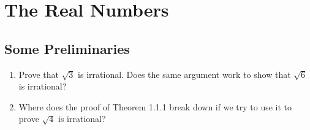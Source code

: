 \documentclass{lew98_solutions}
\begin{document}
\thispagestyle{plain}

\chapter{The Real Numbers}
\label{chap:1}

\setcounter{section}{1}
\section{Some Preliminaries}
\label{sec:1.2}

\begin{exercise}
\label{ex:1.2.1}
    \begin{enumerate}
        \item Prove that \( \sqrt{3} \) is irrational. Does the same argument work to show that \( \sqrt{6} \) is irrational?
    
        \item Where does the proof of Theorem 1.1.1 break down if we try to use it to prove \( \sqrt{4} \) is irrational?
    \end{enumerate}
\end{exercise}
\end{document}
